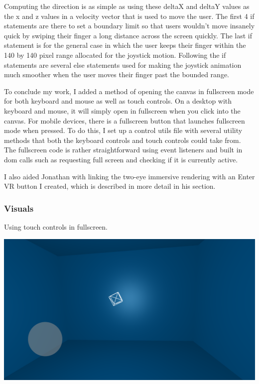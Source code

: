 \documentclass[onecolumn, draftclsnofoot,10pt, compsoc]{IEEEtran}
\begin{document}
Computing the direction is as simple as using these deltaX and deltaY values as the x and z values in a velocity vector that is used to move the user. The first 4 if statements are there to set a boundary limit so that users wouldn't move insanely quick by swiping their finger a long distance across the screen quickly. The last if statement is for the general case in which the user keeps their finger within the 140 by 140 pixel range allocated for the joystick motion. Following the if statements are several else statements used for making the joystick animation much smoother when the user moves their finger past the bounded range.

To conclude my work, I added a method of opening the canvas in fullscreen mode for both keyboard and mouse as well as touch controls. On a desktop with keyboard and mouse, it will simply open in fullscreen when you click into the canvas. For mobile devices, there is a fullscreen button that launches fullscreen mode when pressed. To do this, I set up a control utils file with several utility methods that both the keyboard controls and touch controls could take from. The fullscreen code is rather straightforward using event listeners and built in dom calls such as requesting full screen and checking if it is currently active.

I also aided Jonathan with linking the two-eye immersive rendering with an Enter VR button I created, which is described in more detail in his section.

\subsubsection{Visuals}
Using touch controls in fullscreen.

\includegraphics[width=\linewidth]{images/JoystickFullscreen.png}
\end{document}
